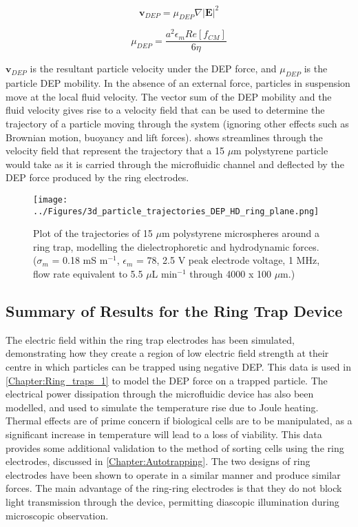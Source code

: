 \begin{equation}
\mathbf{v}_{DEP} = \mu_{DEP} \nabla \left | \textbf{E} \right | ^{2}
\label{eqn:DEP_mobility1}
\end{equation}

\begin{equation}
\mu_{DEP} = \frac{a^{2} \epsilon_{m} Re\left [ f_{CM} \right ]}{6 \eta}
\label{eqn:DEP_mobility2}
\end{equation}

$\mathbf{v}_{DEP}$ is the resultant particle velocity under the DEP force, and $\mu_{DEP}$ is the particle DEP mobility. In the absence of an external force, particles in suspension move at the local fluid velocity. The vector sum of the DEP mobility and the fluid velocity gives rise to a velocity field that can be used to determine the trajectory of a particle moving through the system (ignoring other effects such as Brownian motion, buoyancy and lift forces).  shows streamlines through the velocity field that represent the trajectory that a 15 $\mu$m polystyrene particle would take as it is carried through the microfluidic channel and deflected by the DEP force produced by the ring electrodes.

\begin{figure}[p]
 \centering
 \texttt{[image: ../Figures/3d\_particle\_trajectories\_DEP\_HD\_ring\_plane.png]}
 \caption[Trajectories of 15 $\mu$m polystyrene microspheres around a ring trap.]{Plot of the trajectories of 15 $\mu$m polystyrene microspheres around a ring trap, modelling the dielectrophoretic and hydrodynamic forces. ($\sigma_{m}$ = 0.18 mS m$^{-1}$, $\epsilon_{m}$ = 78, 2.5 V peak electrode voltage, 1 MHz, flow rate equivalent to 5.5 $\mu$L min$^{-1}$ through 4000 x 100 $\mu$m.)}
 \label{fig:3d_particle_trajectories_DEP_HD_ring_plane}
\end{figure}

\subsection{Summary of Results for the Ring Trap Device}

The electric field within the ring trap electrodes has been simulated, demonstrating how they create a region of low electric field strength at their centre in which particles can be trapped using negative DEP. This data is used in \cref{Chapter:Ring_traps_1} to model the DEP force on a trapped particle. The electrical power dissipation through the microfluidic device has also been modelled, and used to simulate the temperature rise due to Joule heating. Thermal effects are of prime concern if biological cells are to be manipulated, as a significant increase in temperature will lead to a loss of viability. This data provides some additional validation to the method of sorting cells using the ring electrodes, discussed in \cref{Chapter:Autotrapping}. The two designs of ring electrodes have been shown to operate in a similar manner and produce similar forces. The main advantage of the ring-ring electrodes is that they do not block light transmission through the device, permitting diascopic illumination during microscopic observation.

